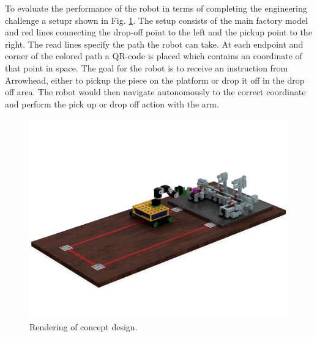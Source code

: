 To evaluate the performance of the robot in terms of completing the engineering challenge a setupr shown in Fig. \ref{fig:factory_setup}. The setup consists of the main factory model and red lines connecting the drop-off point to the left and the pickup point to the right. The read lines specify the path the robot can take. At each endpoint and corner of the colored path a QR-code is placed which contains an coordinate of that point in space. The goal for the robot is to receive an instruction from Arrowhead, either to pickup the piece on the platform or drop it off in the drop off area. The robot would then navigate autonomously to the correct coordinate and perform the pick up or drop off action with the arm. 

\begin{figure}
    \centering
    \includegraphics[width=0.7\columnwidth]{chapters/img/evaluation_setup.png}
    \caption{Rendering of concept design.}
    \label{fig:factory_setup}
\end{figure}